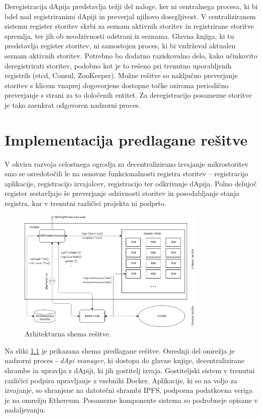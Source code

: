 \documentclass[a4paper, 12pt]{book}
\begin{document}
Deregistracija dApija predstavlja težji del naloge, ker ni centralnega procesa, ki bi bdel nad registriranimi dApiji in preverjal njihovo dosegljivost.
V centraliziranem sistemu register storitev skrbi za seznam aktivnih storitev in registrirane storitve spremlja, ter jih ob neodzivnosti odstrani iz seznama.
Glavna knjiga, ki tu predstavlja register storitev, ni samostojen proces, ki bi vzdrževal aktualen seznam aktivnih storitev.
Potrebno bo dodatno raziskovalno delo, kako učinkovito deregistrirati storitev, podobno kot je to rešeno pri trenutno uporabljenih registrih (etcd, Consul, ZooKeeper).
Možne rešitve so naključno preverjanje storitev s klicem vnaprej dogovorjene dostopne točke oziroma periodično preverjanje s strani za to določenih entitet.
Za deregistracijo posamezne storitve je tako zaenkrat odgovoren nadzorni proces.

\chapter{Implementacija predlagane rešitve}
\label{ch5}

V okviru razvoja celostnega ogrodja za decentralizirano izvajanje mikrostoritev smo se osredotočili le na osnovne funkcionalnosti registra storitev -- registracijo aplikacije, registracijo izvajalcev, registracijo ter odkrivanje dApija.
Polno delujoč register sestavljajo še preverjanje odzivnosti storitev in posodabljanje stanja registra, kar v trenutni različici projekta ni podprto.

\begin{figure}[h]
	\includegraphics[width=0.8\textwidth]{slike/dApi_sl.png}
	\caption{Arhitekturna shema rešitve.}
	\label{scheme}
\end{figure}

Na sliki \ref{scheme} je prikazana shema predlagane rešitve. Osrednji del omrežja je nadzorni proces - 
\textit{dApi manager}, ki dostopa do glavne knjige, decentralizirane shrambe in upravlja z dApiji, ki jih gostitelj izvaja.
Gostiteljski sistem v trenutni različici podpira upravljanje z vsebniki Docker.
Aplikacije, ki so na voljo za izvajanje, so shranjene na datotečni shrambi IPFS, podporna podatkovna veriga je na omrežju Ethereum. Posamezne komponente sistema so podrobneje opisane v nadaljevanju.
\end{document}
